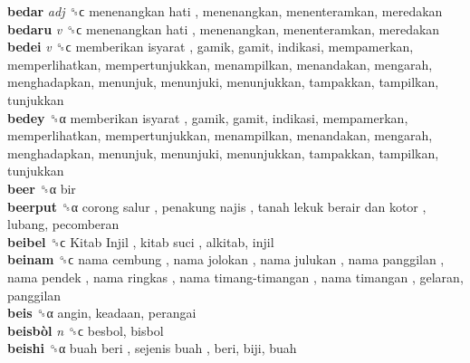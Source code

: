 \textbf{bedar} \emph{adj}  ␝ϲ   menenangkan hati , menenangkan, menenteramkan, meredakan  \\
\textbf{bedaru} \emph{v}  ␝ϲ   menenangkan hati , menenangkan, menenteramkan, meredakan  \\
\textbf{bedei} \emph{v}  ␝ϲ   memberikan isyarat , gamik, gamit, indikasi, mempamerkan, memperlihatkan, mempertunjukkan, menampilkan, menandakan, mengarah, menghadapkan, menunjuk, menunjuki, menunjukkan, tampakkan, tampilkan, tunjukkan  \\
\textbf{bedey} ␝α   memberikan isyarat , gamik, gamit, indikasi, mempamerkan, memperlihatkan, mempertunjukkan, menampilkan, menandakan, mengarah, menghadapkan, menunjuk, menunjuki, menunjukkan, tampakkan, tampilkan, tunjukkan  \\
\textbf{beer} ␝α  bir  \\
\textbf{beerput} ␝α   corong salur ,  penakung najis ,  tanah lekuk berair dan kotor , lubang, pecomberan  \\
\textbf{beibel} ␝ϲ   Kitab Injil ,  kitab suci , alkitab, injil  \\
\textbf{beinam} ␝ϲ   nama cembung ,  nama jolokan ,  nama julukan ,  nama panggilan ,  nama pendek ,  nama ringkas ,  nama timang-timangan ,  nama timangan , gelaran, panggilan  \\
\textbf{beis} ␝α  angin, keadaan, perangai  \\
\textbf{beisbòl} \emph{n}  ␝ϲ  besbol, bisbol  \\
\textbf{beishi} ␝α   buah beri ,  sejenis buah , beri, biji, buah  \\
